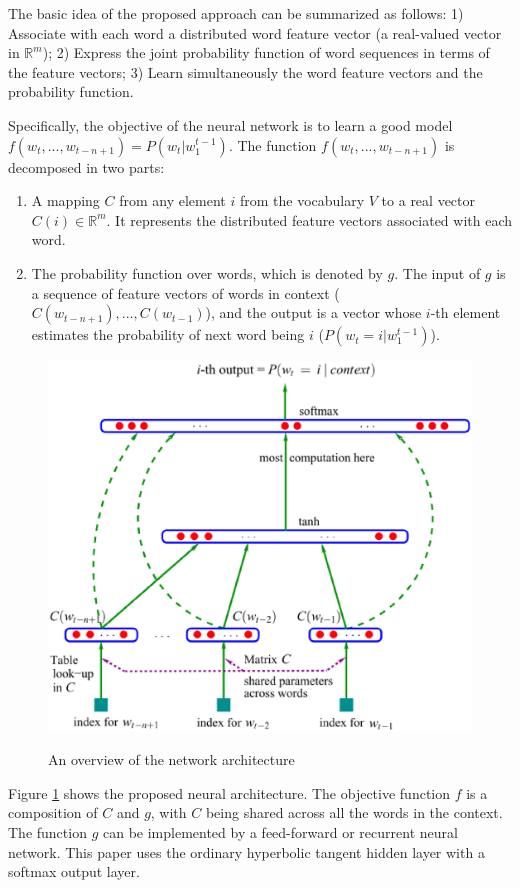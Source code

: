 \documentclass[paper=a4, fontsize=18pt]{article} %
\numberwithin{equation}{section} %
\numberwithin{figure}{section} %
\numberwithin{table}{section} %
\begin{document}
The basic idea of the proposed approach can be summarized as follows: 1) Associate with each word a distributed word feature vector (a real-valued vector in $\mathbb{R}^m$); 2) Express the joint probability function of word sequences in terms of the feature vectors; 3) Learn simultaneously the word feature vectors and the probability function.

Specifically, the objective of the neural network is to learn a good model $f(w_t, ..., w_{t-n+1}) = P(w_t | w_1^{t-1})$. The function $f(w_t, ..., w_{t-n+1})$ is decomposed in two parts:

\begin{enumerate}
\item A mapping $C$ from any element $i$ from the vocabulary $V$ to a real vector $C(i) \in \mathbb{R}^m$. It represents the distributed feature vectors associated with each word.
\item The probability function over words, which is denoted by $g$. The input of $g$ is a sequence of feature vectors of words in context ($C(w_{t-n+1}),..., C(w_{t-1})$), and the output is a vector whose $i$-th element estimates the probability of next word being $i$ ($P(w_t = i | w_1^{t-1})$).
\end{enumerate}

\begin{figure}[htbp]
  \centering
  \includegraphics[width=.8\linewidth]{8_15_DL}\\
  \caption{An overview of the network architecture}\label{fig:DL}
\end{figure}

Figure \ref{fig:DL} shows the proposed neural architecture. The objective  function $f$ is a composition of $C$ and $g$, with $C$ being shared across all the words in the context. The function $g$ can be implemented by a feed-forward or recurrent neural network. This paper uses the ordinary hyperbolic tangent hidden layer with a softmax output layer.
\end{document}
